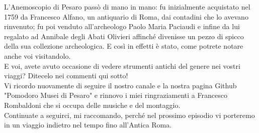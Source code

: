 \documentclass[hidelinks,12pt,a4paper]{article}
\begin{document}
\begin{flushleft}
		L'Anemoscopio di Pesaro passò di mano in mano: fu inizialmente acquistato nel 1759 da Francesco Alfano, un antiquario di Roma, dai contadini che lo avevano rinvenuto; fu poi venduto all'archeologo Paolo Maria Paciaudi e infine da lui regalato ad Annibale degli Abati Olivieri affinché divenisse un pezzo di spicco della sua collezione archeologica. E così in effetti è stato, come potrete notare anche voi visitandolo.\\
		E voi, avete avuto occasione di vedere strumenti antichi del genere nei vostri viaggi? Ditecelo nei commenti qui sotto!\\
		Vi ricordo nuovamente di seguire il nostro canale e la nostra pagina Github "Pomodoro Musei di Pesaro" e rinnovo i miei ringraziamenti a Francesco Rombaldoni che si occupa delle musiche e del montaggio.\\
		Continuate a seguirci, mi raccomando, perché nel prossimo episodio vi porteremo in un viaggio indietro nel tempo fino all'Antica Roma.\\
		

\end{flushleft}
\end{document}
